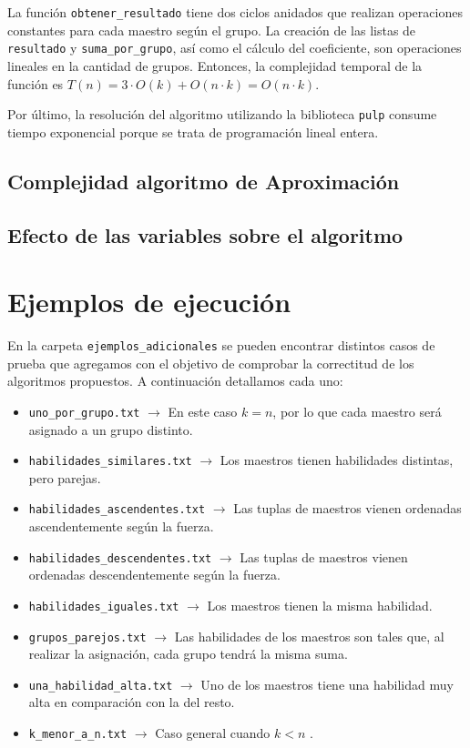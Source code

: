 \documentclass{article}
\begin{document}
La función \texttt{obtener\_resultado} tiene dos ciclos anidados que realizan operaciones constantes para cada maestro según el grupo. La creación de las listas de \texttt{resultado} y \texttt{suma\_por\_grupo}, así como el cálculo del coeficiente, son operaciones lineales en la cantidad de grupos. Entonces, la complejidad temporal de la función es $T(n) = 3 \cdot O(k) + O(n \cdot k) = O(n \cdot k)$.

Por último, la resolución del algoritmo utilizando la biblioteca \texttt{pulp} consume tiempo exponencial porque se trata de programación lineal entera.

\subsection{Complejidad algoritmo de Aproximación}

\subsection{Efecto de las variables sobre el algoritmo}

\section{Ejemplos de ejecución}
\label{sec:ejemplos}

En la carpeta \texttt{ejemplos\_adicionales} se pueden encontrar distintos casos de prueba que agregamos con el objetivo de comprobar la correctitud de los algoritmos propuestos. A continuación detallamos cada uno:
\begin{itemize}
    \item \texttt{uno\_por\_grupo.txt} $\rightarrow$ En este caso $k = n$, por lo que cada maestro será asignado a un grupo distinto.
    \item \texttt{habilidades\_similares.txt} $\rightarrow$ Los maestros tienen habilidades distintas, pero parejas.
    \item \texttt{habilidades\_ascendentes.txt} $\rightarrow$ Las tuplas de maestros vienen ordenadas ascendentemente según la fuerza.
    \item \texttt{habilidades\_descendentes.txt} $\rightarrow$ Las tuplas de maestros vienen ordenadas descendentemente según la fuerza.
    \item \texttt{habilidades\_iguales.txt} $\rightarrow$ Los maestros tienen la misma habilidad.
    \item \texttt{grupos\_parejos.txt} $\rightarrow$ Las habilidades de los maestros son tales que, al realizar la asignación, cada grupo tendrá la misma suma.
    \item \texttt{una\_habilidad\_alta.txt} $\rightarrow$ Uno de los maestros tiene una habilidad muy alta en comparación con la del resto.
    \item \texttt{k\_menor\_a\_n.txt} $\rightarrow$ Caso general cuando $k < n$ .
\end{itemize}
\end{document}
